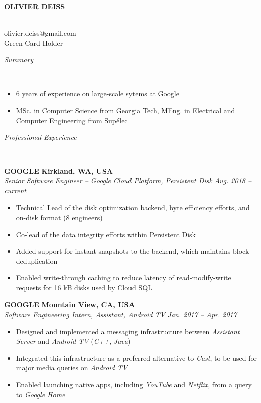 \documentclass[a4paper, 12pt]{article}
\newcommand{\marginline}{-0.3cm}
\newcommand{\margincontent}{-0.6cm}
\newcommand{\margincontentnotextbefore}{-0.3cm}
\newcommand{\marginbeforesection}{0.35cm}
\newcommand{\linewidthperso}{0.02cm}
\newcommand{\styletitle}[1]{\textbf{#1}}
\newcommand{\styledesc}[1]{\textit{#1}}
\newcommand{\styleloc}[1]{\textbf{#1}}
\newcommand{\styledates}[1]{\textit{#1}}
\newcommand{\stylesection}[1]{
  \vspace{\marginbeforesection}
  \begin{normalsize}\textit{#1}\end{normalsize}
  \vspace{\marginline}\\
  \noindent\makebox[\linewidth]{\rule{\textwidth}{\linewidthperso}}

}
\begin{document}
\begin{footnotesize}

\begin{center}
  \begin{small}\textbf{OLIVIER DEISS}\end{small}\\
  olivier.deiss@gmail.com\\
  Green Card Holder
\end{center}

\stylesection{Summary}

\vspace{\margincontentnotextbefore}
\begin{itemize}
  \item 6 years of experience on large-scale sytems at Google
  \item MSc. in Computer Science from Georgia Tech, MEng. in Electrical and Computer Engineering from Sup\'elec
\end{itemize}

\stylesection{Professional Experience}

\styletitle{GOOGLE} \hfill \styleloc{Kirkland, WA, USA}\\
\styledesc{Senior Software Engineer -- Google Cloud Platform, Persistent Disk} \hfill \styledates{Aug. 2018 -- current}\\
\vspace{\margincontent}
\begin{itemize}
  \item Technical Lead of the disk optimization backend, byte efficiency efforts, and on-disk format (8 engineers)
  \item Co-lead of the data integrity efforts within Persistent Disk
  \item Added support for instant snapshots to the backend, which maintains block deduplication
  \item Enabled write-through caching to reduce latency of read-modify-write requests for 16 kB disks used by Cloud SQL
\end{itemize}

\styletitle{GOOGLE} \hfill \styleloc{Mountain View, CA, USA}\\
\styledesc{Software Engineering Intern, Assistant, Android TV} \hfill \styledates{Jan. 2017 -- Apr. 2017}\\
\vspace{\margincontent}
\begin{itemize}
  \item Designed and implemented a messaging infrastructure between \textit{Assistant Server} and \textit{Android TV} (\textit{C++}, \textit{Java})
  \item Integrated this infrastructure as a preferred alternative to \textit{Cast}, to be used for major media queries on \textit{Android TV}
  \item Enabled launching native apps, including \textit{YouTube} and \textit{Netflix}, from a query to \textit{Google Home}
\end{itemize}


\end{footnotesize}
\end{document}
